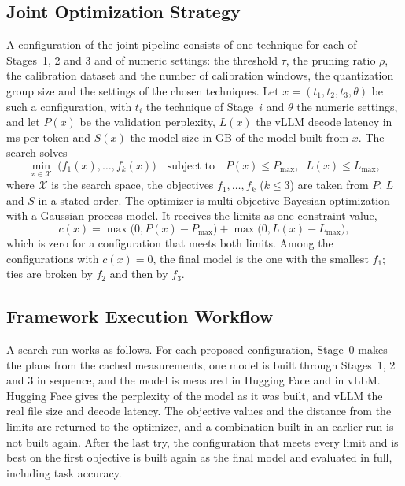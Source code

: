\documentclass[num-refs]{wiley-article}
\begin{document}
\subsection{Joint Optimization Strategy}

A configuration of the joint pipeline consists of one technique for each of Stages~1, 2 and 3 and of numeric settings: the threshold $\tau$, the pruning ratio $\rho$, the calibration dataset and the number of calibration windows, the quantization group size and the settings of the chosen techniques. Let $x = (t_1, t_2, t_3, \theta)$ be such a configuration, with $t_i$ the technique of Stage~$i$ and $\theta$ the numeric settings, and let $P(x)$ be the validation perplexity, $L(x)$ the vLLM decode latency in ms per token and $S(x)$ the model size in GB of the model built from $x$. The search solves
\begin{equation}
  \min_{x \in \mathcal{X}} \; \bigl(f_1(x), \ldots, f_k(x)\bigr) \quad \text{subject to} \quad P(x) \le P_{\max}, \;\; L(x) \le L_{\max},
  \label{eq:search}
\end{equation}
where $\mathcal{X}$ is the search space, the objectives $f_1, \ldots, f_k$ ($k \le 3$) are taken from $P$, $L$ and $S$ in a stated order. The optimizer is multi-objective Bayesian optimization with a Gaussian-process model. It receives the limits as one constraint value,
\begin{equation}
  c(x) = \max\bigl(0, P(x) - P_{\max}\bigr) + \max\bigl(0, L(x) - L_{\max}\bigr),
  \label{eq:constraint}
\end{equation}
which is zero for a configuration that meets both limits. Among the configurations with $c(x) = 0$, the final model is the one with the smallest $f_1$; ties are broken by $f_2$ and then by $f_3$.

\subsection{Framework Execution Workflow}

A search run works as follows. For each proposed configuration, Stage~0 makes the plans from the cached measurements, one model is built through Stages~1, 2 and 3 in sequence, and the model is measured in Hugging Face and in vLLM. Hugging Face gives the perplexity of the model as it was built, and vLLM the real file size and decode latency. The objective values and the distance from the limits are returned to the optimizer, and a combination built in an earlier run is not built again. After the last try, the configuration that meets every limit and is best on the first objective is built again as the final model and evaluated in full, including task accuracy.
\end{document}
